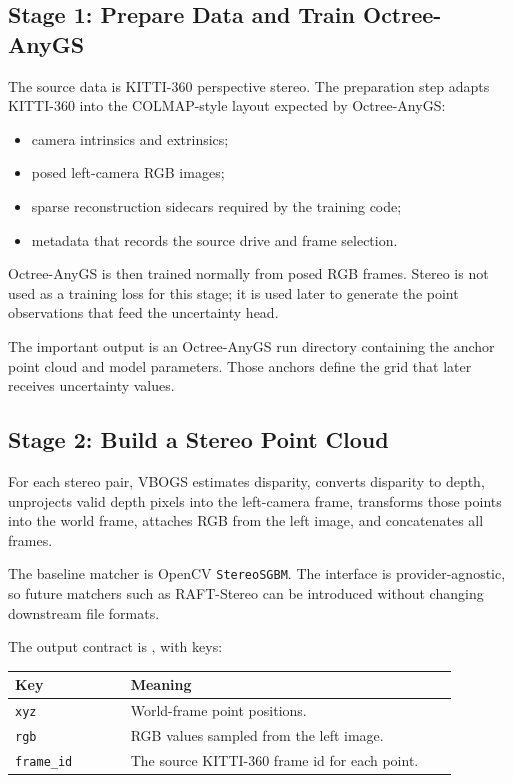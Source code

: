 \documentclass[11pt]{article}
\begin{document}
\subsection{Stage 1: Prepare Data and Train Octree-AnyGS}

The source data is KITTI-360 perspective stereo. The preparation step adapts
KITTI-360 into the COLMAP-style layout expected by Octree-AnyGS:

\begin{itemize}
  \item camera intrinsics and extrinsics;
  \item posed left-camera RGB images;
  \item sparse reconstruction sidecars required by the training code;
  \item metadata that records the source drive and frame selection.
\end{itemize}

Octree-AnyGS is then trained normally from posed RGB frames. Stereo is not used
as a training loss for this stage; it is used later to generate the point
observations that feed the uncertainty head.

The important output is an Octree-AnyGS run directory containing the anchor
point cloud and model parameters. Those anchors define the grid that later
receives uncertainty values.

\subsection{Stage 2: Build a Stereo Point Cloud}

For each stereo pair, VBOGS estimates disparity, converts disparity to depth,
unprojects valid depth pixels into the left-camera frame, transforms those
points into the world frame, attaches RGB from the left image, and concatenates
all frames.

The baseline matcher is OpenCV \texttt{StereoSGBM}. The interface is
provider-agnostic, so future matchers such as RAFT-Stereo can be introduced
without changing downstream file formats.

The output contract is , with keys:

\begin{longtable}{@{}p{0.24\linewidth}p{0.68\linewidth}@{}}
\toprule
\textbf{Key} & \textbf{Meaning} \\
\midrule
\endhead
\texttt{xyz} & World-frame point positions. \\
\texttt{rgb} & RGB values sampled from the left image. \\
\texttt{frame\_id} & The source KITTI-360 frame id for each point. \\
\bottomrule
\end{longtable}
\end{document}
